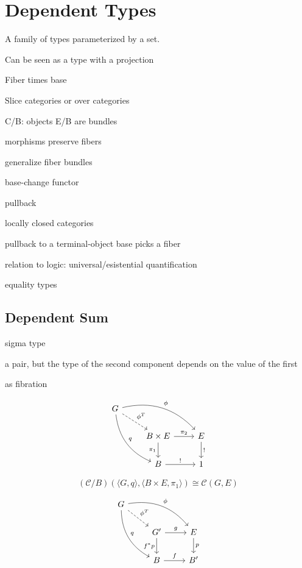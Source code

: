 \documentclass[DaoFP]{subfiles}
\begin{document}
\setcounter{chapter}{13}

\chapter{Dependent Types}

A family of types parameterized by a set.

Can be seen as a type with a projection

Fiber times base

Slice categories or over categories

C/B: objects E/B are bundles

morphisms preserve fibers

generalize fiber bundles

base-change functor

pullback 


locally closed categories

pullback to a terminal-object base picks a fiber

relation to logic: universal/esistential quantification

equality types

\section{Dependent Sum}

sigma type

a pair, but the type of the second component depends on the value of the first

as fibration 

\[
 \begin{tikzcd}
 G
 \arrow[dr, dashed, "\phi^T"]
 \arrow[drr, bend left, "\phi"]
 \arrow[ddr, bend right, "q"]
 \\
 &B \times E
 \arrow[r, "\pi_2"]
 \arrow[d, "\pi_1"']
 &E
 \arrow[d, "!"]
 \\
 &B
 \arrow[r, "!"]
 &1
  \end{tikzcd}
\]

\[(\mathcal{C}/B)(\langle G, q \rangle, \langle B \times E, \pi_1 \rangle) \cong \mathcal{C}(G, E) \]

\[
 \begin{tikzcd}
 G
 \arrow[dr, dashed, "\phi^T"]
 \arrow[drr, bend left, "\phi"]
 \arrow[ddr, bend right, "q"]
 \\
 &G'
 \arrow[r, "g"]
 \arrow[d, "f^* p"']
 &E
 \arrow[d, "p"]
 \\
 &B
 \arrow[r, "f"]
 &B'
  \end{tikzcd}
\]
\end{document}
